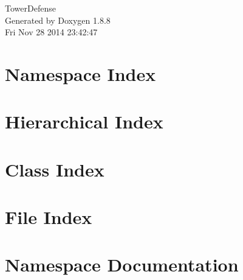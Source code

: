 \documentclass[twoside]{book}
\newcommand{\+}{\discretionary{\mbox{\scriptsize$\hookleftarrow$}}{}{}}
\newcommand{\clearemptydoublepage}{%
  \newpage{\pagestyle{empty}\cleardoublepage}%
}
\begin{document}
\hypersetup{pageanchor=false,
             bookmarks=true,
             bookmarksnumbered=true,
             pdfencoding=unicode
            }
\begin{titlepage}
\vspace*{7cm}
\begin{center}%
{\Large Tower\+Defense }\\
\vspace*{1cm}
{\large Generated by Doxygen 1.8.8}\\
\vspace*{0.5cm}
{\small Fri Nov 28 2014 23:42:47}\\
\end{center}
\end{titlepage}
\clearemptydoublepage
\tableofcontents
\clearemptydoublepage
{}
\hypersetup{pageanchor=true}

\chapter{Namespace Index}

\chapter{Hierarchical Index}

\chapter{Class Index}

\chapter{File Index}

\chapter{Namespace Documentation}

\end{document}
